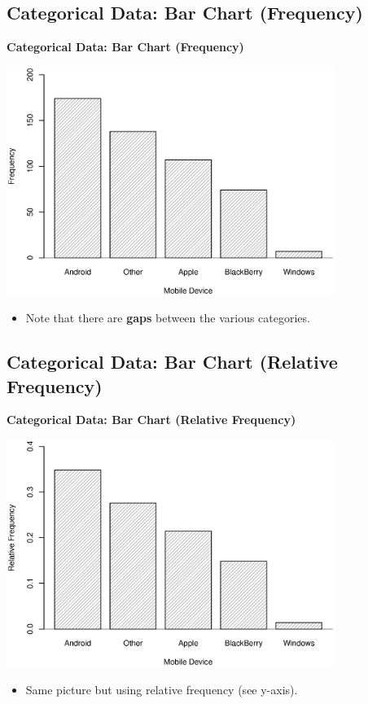 \documentclass[compress]{beamer}        %
\makeatletter
\newcommand{\tcb}{\textcolor{beamer@blendedblue}}
\makeatother
\begin{document}
\subsection{Categorical Data: Bar Chart (Frequency)}
\begin{frame}{\bf \tcb{Categorical Data: Bar Chart (Frequency)}\\[-1.1cm]}
\begin{center}
\includegraphics[width=0.8\textwidth, trim = 0.0cm 0.5cm 0.3cm 1cm, clip]{MobileDevice}
\end{center}
\begin{itemize}\itemsep0.2cm
\item Note that there are {\bf gaps} between the various categories.
\end{itemize}
\end{frame}

\subsection{Categorical Data: Bar Chart (Relative Frequency)}
\begin{frame}{\bf \tcb{Categorical Data: Bar Chart (Relative Frequency)}\\[-1.1cm]}
\begin{center}
\includegraphics[width=0.8\textwidth, trim = 0.0cm 0.5cm 0.3cm 1cm, clip]{MobileDevice-Rel}
\end{center}
\begin{itemize}\itemsep0.2cm
\item Same picture but using relative frequency (see y-axis).
\end{itemize}
\end{frame}
\end{document}
